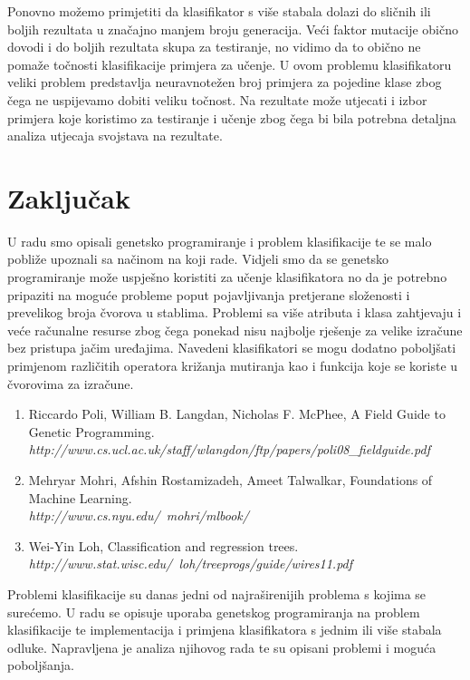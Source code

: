 \documentclass[times, utf8, zavrsni]{fer}
\begin{document}
Ponovno možemo primjetiti da klasifikator s više stabala dolazi do sličnih ili boljih rezultata u značajno manjem broju generacija. Veći faktor mutacije obično dovodi i do boljih rezultata skupa za testiranje, no vidimo da to obično ne pomaže točnosti klasifikacije primjera za učenje. U ovom problemu klasifikatoru veliki problem predstavlja neuravnotežen broj primjera za pojedine klase zbog čega ne uspijevamo dobiti veliku točnost. Na rezultate može utjecati i izbor primjera koje koristimo za testiranje i učenje zbog čega bi bila potrebna detaljna analiza utjecaja svojstava na rezultate.

\chapter{Zaključak}
U radu smo opisali genetsko programiranje i problem klasifikacije te se malo pobliže upoznali sa načinom na koji rade. Vidjeli smo da se genetsko programiranje može uspješno koristiti za učenje klasifikatora no da je potrebno pripaziti na moguće probleme poput pojavljivanja pretjerane složenosti i prevelikog broja čvorova u stablima. Problemi sa više atributa i klasa zahtjevaju i veće računalne resurse zbog čega ponekad nisu najbolje rješenje za velike izračune bez pristupa jačim uređajima. Navedeni klasifikatori se mogu dodatno poboljšati primjenom različitih operatora križanja mutiranja kao i funkcija koje se koriste u čvorovima za izračune. 





\begin{enumerate}
	\item Riccardo Poli, William B. Langdan, Nicholas F. McPhee, A Field Guide to Genetic Programming. \\
	\emph{http://www.cs.ucl.ac.uk/staff/wlangdon/ftp/papers/poli08\_fieldguide.pdf}

	\item Mehryar Mohri, Afshin Rostamizadeh, Ameet Talwalkar, Foundations of Machine Learning. \\
	\emph{http://www.cs.nyu.edu/~mohri/mlbook/}

	\item Wei-Yin Loh, Classification and regression trees. \\
	\emph{http://www.stat.wisc.edu/~loh/treeprogs/guide/wires11.pdf}
\end{enumerate}

\begin{sazetak}
Problemi klasifikacije su danas jedni od najraširenijih problema s kojima se surećemo. U radu se opisuje uporaba genetskog programiranja na problem klasifikacije te implementacija i primjena klasifikatora s jednim ili više stabala odluke. Napravljena je analiza njihovog rada te su opisani problemi i moguća poboljšanja.

\end{sazetak}
\end{document}
